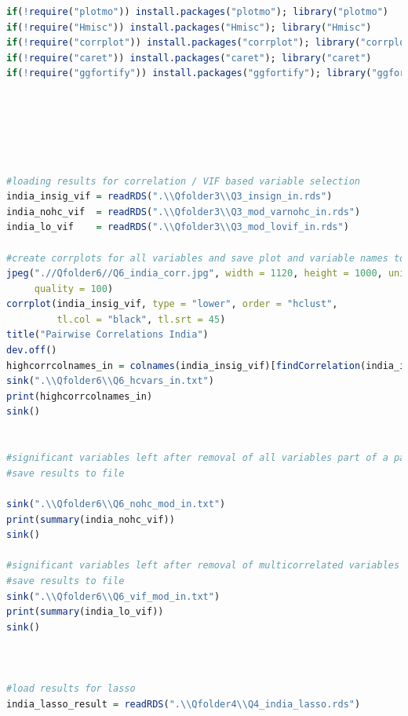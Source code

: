 \documentclass[11pt]{article}
\begin{document}
\begin{lstlisting}[language= R]
if(!require("plotmo")) install.packages("plotmo"); library("plotmo")
if(!require("Hmisc")) install.packages("Hmisc"); library("Hmisc")
if(!require("corrplot")) install.packages("corrplot"); library("corrplot")
if(!require("caret")) install.packages("caret"); library("caret")
if(!require("ggfortify")) install.packages("ggfortify"); library("ggfortify")






#loading results for correlation / VIF based variable selection
india_insig_vif = readRDS(".\\Qfolder3\\Q3_insign_in.rds")
india_nohc_vif  = readRDS(".\\Qfolder3\\Q3_mod_varnohc_in.rds")
india_lo_vif    = readRDS(".\\Qfolder3\\Q3_mod_lovif_in.rds")

#create corrplots for all variables and save plot and variable names to file
jpeg(".//Qfolder6//Q6_india_corr.jpg", width = 1120, height = 1000, units = "px", pointsize = 20,
     quality = 100)
corrplot(india_insig_vif, type = "lower", order = "hclust", 
         tl.col = "black", tl.srt = 45)
title("Pairwise Correlations India")
dev.off()
highcorrcolnames_in = colnames(india_insig_vif)[findCorrelation(india_insig_vif, cutoff = 0.70)]
sink(".\\Qfolder6\\Q6_hcvars_in.txt")
print(highcorrcolnames_in)
sink() 


#significant variables left after removal of all variables part of a pair with correlation >0.7
#save results to file

sink(".\\Qfolder6\\Q6_nohc_mod_in.txt")
print(summary(india_nohc_vif))
sink() 

#significant variables left after removal of multicorrelated variables by removeVif()
#save results to file
sink(".\\Qfolder6\\Q6_vif_mod_in.txt")
print(summary(india_lo_vif))
sink() 



#load results for lasso
india_lasso_result = readRDS(".\\Qfolder4\\Q4_india_lasso.rds")


\end{lstlisting}
\end{document}
